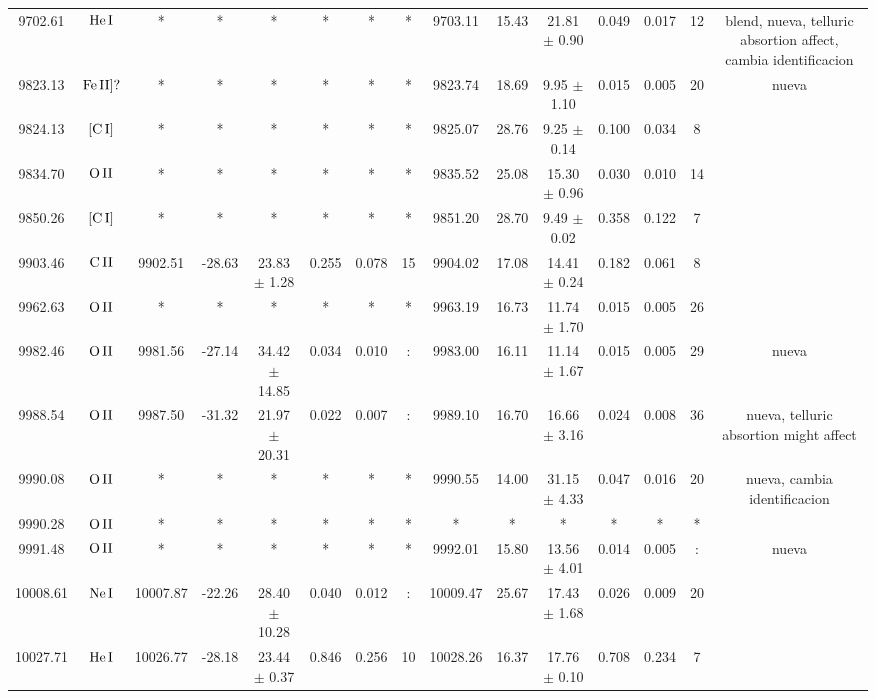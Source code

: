 \documentclass{article}
\begin{document}
\begin{table*}
\begin{adjustbox}{width=\textwidth}
\begin{tabular}{ccccccccccccccc}
9702.61 & $\mbox{He}\thinspace \mbox{I}$ & * & * & * & * & * & * & 9703.11 & 15.43 & 21.81 $\pm$ 0.90 & 0.049 & 0.017 & 12 &  blend, nueva, telluric absortion affect, cambia identificacion \\
9823.13 & $\mbox{Fe}\thinspace \mbox{II]?}$ & * & * & * & * & * & * & 9823.74 & 18.69 & 9.95 $\pm$ 1.10 & 0.015 & 0.005 & 20 &  nueva \\
9824.13 & $\mbox{[C}\thinspace \mbox{I]}$ & * & * & * & * & * & * & 9825.07 & 28.76 & 9.25 $\pm$ 0.14 & 0.100 & 0.034 & 8 &  \\
9834.70 & $\mbox{O}\thinspace \mbox{II}$ & * & * & * & * & * & * & 9835.52 & 25.08 & 15.30 $\pm$ 0.96 & 0.030 & 0.010 & 14 &  \\
9850.26 & $\mbox{[C}\thinspace \mbox{I]}$ & * & * & * & * & * & * & 9851.20 & 28.70 & 9.49 $\pm$ 0.02 & 0.358 & 0.122 & 7 &  \\
9903.46 & $\mbox{C}\thinspace \mbox{II}$ & 9902.51 & -28.63 & 23.83 $\pm$ 1.28 & 0.255 & 0.078 & 15 & 9904.02 & 17.08 & 14.41 $\pm$ 0.24 & 0.182 & 0.061 & 8 &  \\
9962.63 & $\mbox{O}\thinspace \mbox{II}$ & * & * & * & * & * & * & 9963.19 & 16.73 & 11.74 $\pm$ 1.70 & 0.015 & 0.005 & 26 &  \\
9982.46 & $\mbox{O}\thinspace \mbox{II}$ & 9981.56 & -27.14 & 34.42 $\pm$ 14.85 & 0.034 & 0.010 & : & 9983.00 & 16.11 & 11.14 $\pm$ 1.67 & 0.015 & 0.005 & 29 &  nueva \\
9988.54 & $\mbox{O}\thinspace \mbox{II}$ & 9987.50 & -31.32 & 21.97 $\pm$ 20.31 & 0.022 & 0.007 & : & 9989.10 & 16.70 & 16.66 $\pm$ 3.16 & 0.024 & 0.008 & 36 &  nueva, telluric absortion might affect \\
9990.08 & $\mbox{O}\thinspace \mbox{II}$ & * & * & * & * & * & * & 9990.55 & 14.00 & 31.15 $\pm$ 4.33 & 0.047 & 0.016 & 20 &  nueva, cambia identificacion \\
9990.28 & $\mbox{O}\thinspace \mbox{II}$ & * & * & * & * & * & * & * & * & * & * & * & * &  \\
9991.48 & $\mbox{O}\thinspace \mbox{II}$ & * & * & * & * & * & * & 9992.01 & 15.80 & 13.56 $\pm$ 4.01 & 0.014 & 0.005 & : &  nueva \\
10008.61 & $\mbox{Ne}\thinspace \mbox{I}$ & 10007.87 & -22.26 & 28.40 $\pm$ 10.28 & 0.040 & 0.012 & : & 10009.47 & 25.67 & 17.43 $\pm$ 1.68 & 0.026 & 0.009 & 20 &  \\
10027.71 & $\mbox{He}\thinspace \mbox{I}$ & 10026.77 & -28.18 & 23.44 $\pm$ 0.37 & 0.846 & 0.256 & 10 & 10028.26 & 16.37 & 17.76 $\pm$ 0.10 & 0.708 & 0.234 & 7 &  \\

\end{tabular}
\end{adjustbox}
\end{table*}
\end{document}
